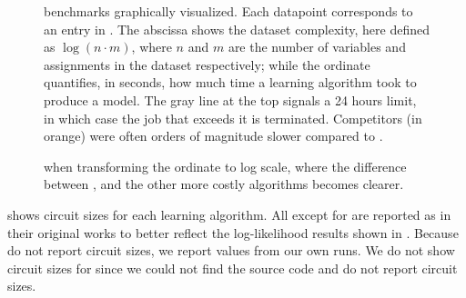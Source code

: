 \begin{figure}[t]
  \def\svgwidth{\textwidth}
  \caption{ benchmarks graphically visualized. Each datapoint corresponds to an
    entry in . The abscissa shows the dataset complexity, here defined as
    $\log(n\cdot m)$, where $n$ and $m$ are the number of variables and assignments in the dataset
    respectively; while the ordinate quantifies, in seconds, how much time a learning algorithm
    took to produce a model. The \colorbox{jplotsgray}{\color{white}gray} line at the top signals a
    24 hours limit, in which case the job that exceeds it is terminated. Competitors (in
    \colorbox{jplots2}{\color{white}orange}) were often orders of magnitude slower compared to
    .}
  \label{fig:time-linear}
\end{figure}

\begin{figure}[t]
  \def\svgwidth{\textwidth}
  \caption{ when transforming the ordinate to log scale, where the difference
    between ,  and the other more costly algorithms becomes
    clearer.}
  \label{fig:time-log}
\end{figure}

 shows circuit sizes for each learning algorithm. All except for
 are reported as in their original works to better reflect the log-likelihood
results shown in . Because \citet{gens13} do not report circuit sizes, we report
values from our own runs. We do not show circuit sizes for  since we could not
find the source code and \citet{jaini18a} do not report circuit sizes.

